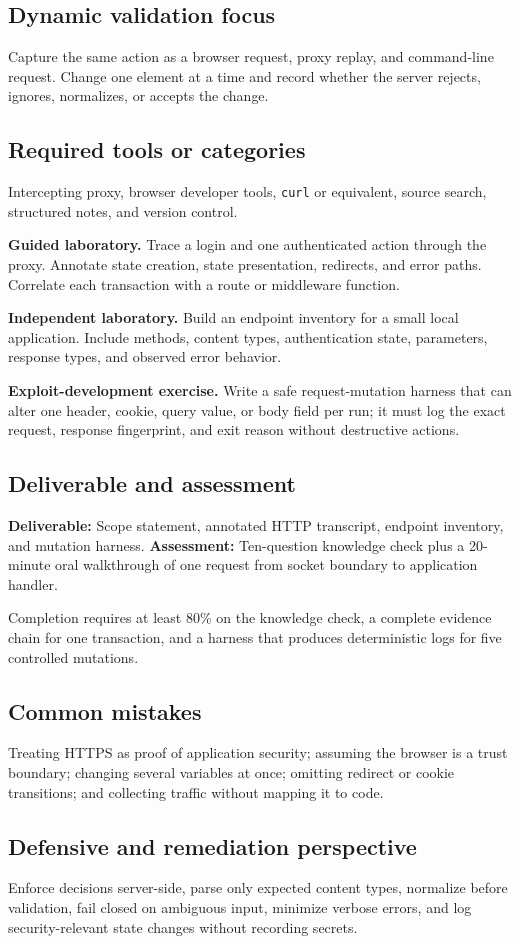 \documentclass[11pt]{article}
\newcommand{\weekfield}[2]{%
  \Needspace{5\baselineskip}
  \subsection*{#1}
  #2
}
\newcommand{\deliverable}[1]{\textbf{Deliverable:} #1}
\newcommand{\assessment}[1]{\textbf{Assessment:} #1}
\begin{document}
\weekfield{Dynamic validation focus}{Capture the same action as a browser
request, proxy replay, and command-line request. Change one element at a time and
record whether the server rejects, ignores, normalizes, or accepts the change.}

\weekfield{Required tools or categories}{Intercepting proxy, browser developer
tools, \texttt{curl} or equivalent, source search, structured notes, and version
control.}

\begin{labbox}
\textbf{Guided laboratory.} Trace a login and one authenticated action through
the proxy. Annotate state creation, state presentation, redirects, and error
paths. Correlate each transaction with a route or middleware function.

\textbf{Independent laboratory.} Build an endpoint inventory for a small local
application. Include methods, content types, authentication state, parameters,
response types, and observed error behavior.

\textbf{Exploit-development exercise.} Write a safe request-mutation harness that
can alter one header, cookie, query value, or body field per run; it must log the
exact request, response fingerprint, and exit reason without destructive actions.
\end{labbox}

\weekfield{Deliverable and assessment}{\deliverable{Scope statement, annotated
HTTP transcript, endpoint inventory, and mutation harness.}
\assessment{Ten-question knowledge check plus a 20-minute oral walkthrough of
one request from socket boundary to application handler.}}

\begin{checkpoints}
Completion requires at least 80\% on the knowledge check, a complete evidence
chain for one transaction, and a harness that produces deterministic logs for
five controlled mutations.
\end{checkpoints}

\weekfield{Common mistakes}{Treating HTTPS as proof of application security;
assuming the browser is a trust boundary; changing several variables at once;
omitting redirect or cookie transitions; and collecting traffic without mapping
it to code.}

\weekfield{Defensive and remediation perspective}{Enforce decisions server-side,
parse only expected content types, normalize before validation, fail closed on
ambiguous input, minimize verbose errors, and log security-relevant state changes
without recording secrets.}
\end{document}
